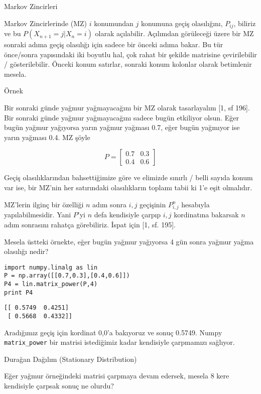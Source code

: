 \documentclass[12pt,fleqn]{article}\usepackage{../../common}
\begin{document}
Markov Zincirleri

Markov Zincirlerinde (MZ) $i$ konumundan $j$ konumuna geçiş olasılığını,
$P_{ij}$, biliriz ve bu $P(X_{n+1} = j | X_{n} = i)$ olarak açılabilir. Açılımdan  
görüleceği üzere bir MZ sonraki adıma geçiş olasılığı için sadece
bir önceki adıma bakar. Bu tür önce/sonra yapısındaki iki boyutlu hal, 
çok rahat bir şekilde matrisine çevirilebilir / gösterilebilir. Önceki konum 
satırlar, sonraki konum kolonlar olarak betimlenir mesela. 

Örnek

Bir sonraki günde yağmur yağmayacağını bir MZ olarak tasarlayalım [1, sf 196].
Bir sonraki günde yağmur yağmayacağını sadece bugün etkiliyor olsun. Eğer bugün
yağmur yağıyorsa yarın yağmur yağması 0.7, eğer bugün yağmıyor ise yarın
yağması 0.4. MZ şöyle

$$ 
P =
\left[\begin{array}{cc}
0.7 & 0.3 \\
0.4 & 0.6
\end{array}\right]
$$

Geçiş olasılıklarından bahsettiğimize göre ve elimizde sınırlı / belli
sayıda konum var ise, bir MZ'nin her satırındaki olasılıkların toplamı
tabii ki 1'e eşit olmalıdır. 

MZ'lerin ilginç bir özelliği $n$ adım sonra $i,j$ geçişinin $P_{i,j}^n$
hesabıyla yapılabilmesidir. Yani $P$'yi $n$ defa kendisiyle çarpıp $i,j$
kordinatına bakarsak $n$ adım sonrasını rahatça görebiliriz. İspat için
[1, sf. 195].

Mesela üstteki örnekte, eğer bugün yağmur yağıyorsa 4 gün sonra yağmur
yağma olasılığı nedir? 

\begin{verbatim}
import numpy.linalg as lin
P = np.array([[0.7,0.3],[0.4,0.6]])
P4 = lin.matrix_power(P,4)
print P4
\end{verbatim}

\begin{verbatim}
[[ 0.5749  0.4251]
 [ 0.5668  0.4332]]
\end{verbatim}

Aradığımız geçiş için kordinat 0,0'a bakıyoruz ve sonuç 0.5749. Numpy
\verb!matrix_power! bir matrisi istediğimiz kadar kendisiyle çarpmamızı
sağlıyor. 

Durağan Dağılım (Stationary Distribution)

Eğer yağmur örneğindeki matrisi çarpmaya devam edersek, mesela 8 kere
kendisiyle çarpsak sonuç ne olurdu? 
\end{document}
